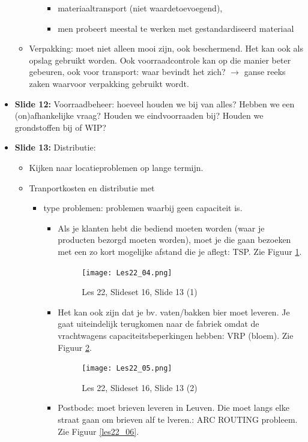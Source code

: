 \documentclass[10pt,a4paper]{report}
\begin{document}
\begin{itemize}
\begin{itemize}
\begin{itemize}
\begin{itemize}
\item materiaaltransport (niet waardetoevoegend), 
\item men probeert meestal te werken met gestandardiseerd materiaal
\end{itemize}
\end{itemize}
\item Verpakking: moet niet alleen mooi zijn, ook beschermend. Het kan ook als opslag gebruikt worden. Ook voorraadcontrole kan op die manier beter gebeuren, ook voor transport: waar bevindt het zich? $\rightarrow$ ganse reeks zaken waarvoor verpakking gebruikt wordt.
\end{itemize}
\item \textbf{Slide 12:} Voorraadbeheer: hoeveel houden we bij van alles? Hebben we een (on)afhankelijke vraag? Houden we eindvoorraaden bij? Houden we grondstoffen bij of WIP? 
\item \textbf{Slide 13:} Distributie: 
\begin{itemize}
\item Kijken naar locatieproblemen op lange termijn.
\item Tranportkosten en distributie met 
\begin{itemize}
\item type problemen: problemen waarbij geen capaciteit is. 
\begin{itemize}
\item Als je klanten hebt die bediend moeten worden (waar je producten bezorgd moeten worden), moet je die gaan bezoeken met een zo kort mogelijke afstand die je aflegt: TSP. Zie Figuur \ref{les22_04}.

\begin{figure}[h!]
\centering
\texttt{[image: Les22\_04.png]}
\caption{Les 22, Slideset 16, Slide 13 (1)} 
\label{les22_04}
\end{figure}
			
\item Het kan ook zijn dat je bv. vaten/bakken bier moet leveren. Je gaat uiteindelijk terugkomen naar de fabriek omdat de vrachtwagens capaciteitsbeperkingen hebben: VRP (bloem). Zie Figuur \ref{les22_05}.

\begin{figure}[h!]
\centering
\texttt{[image: Les22\_05.png]}
\caption{Les 22, Slideset 16, Slide 13 (2)} 
\label{les22_05}
\end{figure}		
			
\item Postbode: moet brieven leveren in Leuven. Die moet langs elke straat gaan om brieven alf te lveren.: ARC ROUTING probleem. Zie Figuur \ref{les22_06}.


\end{itemize}
\end{itemize}
\end{itemize}
\end{itemize}
\end{document}
